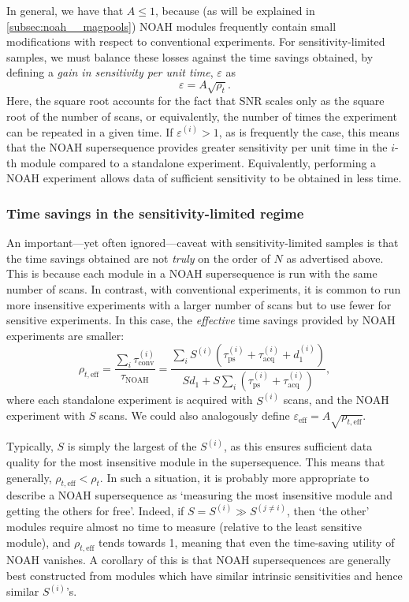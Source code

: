 In general, we have that $A \leq 1$, because (as will be explained in \cref{subsec:noah__magpools}) NOAH modules frequently contain small modifications with respect to conventional experiments.
For sensitivity-limited samples, we must balance these losses against the time savings obtained, by defining a \textit{gain in sensitivity per unit time}, $\varepsilon$ as
\begin{equation}
    \label{eq:varepsilon_i}
    \varepsilon = A \sqrt{\rho_t}.
\end{equation}
Here, the square root accounts for the fact that SNR scales only as the square root of the number of scans, or equivalently, the number of times the experiment can be repeated in a given time.
If $\varepsilon^{(i)} > 1$, as is frequently the case, this means that the NOAH supersequence provides greater sensitivity per unit time in the $i$-th module compared to a standalone experiment.
Equivalently, performing a NOAH experiment allows data of sufficient sensitivity to be obtained in less time.


\subsubsection{Time savings in the sensitivity-limited regime}

An important---yet often ignored---caveat with sensitivity-limited samples is that the time savings obtained are not \textit{truly} on the order of $N$ as advertised above.
This is because each module in a NOAH supersequence is run with the same number of scans.
In contrast, with conventional experiments, it is common to run more insensitive experiments with a larger number of scans but to use fewer for sensitive experiments.
In this case, the \textit{effective} time savings provided by NOAH experiments are smaller:
\begin{equation}
    \label{eq:rho_t_eff}
    \rho_{t,\text{eff}}
    = \frac{\sum_i \tau_\text{conv}^{(i)}}{\tau_\text{NOAH}}
    = \frac{{\sum_i S^{(i)}(\tau_\text{ps}^{(i)} + \tau_\text{acq}^{(i)} + d_1^{(i)})}}{Sd_1 + S\sum_i (\tau_\text{ps}^{(i)} + \tau_\text{acq}^{(i)})},
\end{equation}
where each standalone experiment is acquired with $S^{(i)}$ scans, and the NOAH experiment with $S$ scans.
We could also analogously define $\varepsilon_\text{eff} = A\sqrt{\rho_{t,\text{eff}}}$.

Typically, $S$ is simply the largest of the $S^{(i)}$, as this ensures sufficient data quality for the most insensitive module in the supersequence.
This means that generally, $\rho_{t,\text{eff}} < \rho_t$.
In such a situation, it is probably more appropriate to describe a NOAH supersequence as `measuring the most insensitive module and getting the others for free'.
Indeed, if $S = S^{(i)} \gg S^{(j\neq i)}$, then `the other' modules require almost no time to measure (relative to the least sensitive module), and $\rho_{t,\text{eff}}$ tends towards 1, meaning that even the time-saving utility of NOAH vanishes.
A corollary of this is that NOAH supersequences are generally best constructed from modules which have similar intrinsic sensitivities and hence similar $S^{(i)}$'s.

